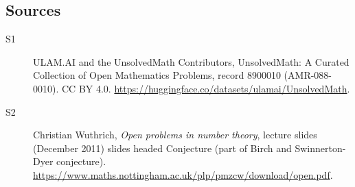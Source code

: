 \documentclass[11pt]{article}
\begin{document}
\subsection{Sources}
\begin{description}
\item[\hypertarget{source:8900010:1}{S1}] ULAM.AI and the UnsolvedMath Contributors, UnsolvedMath: A Curated Collection of Open Mathematics Problems, record 8900010 (AMR-088-0010). CC BY 4.0. \url{https://huggingface.co/datasets/ulamai/UnsolvedMath}.
\item[\hypertarget{source:8900010:2}{S2}] Christian Wuthrich, \emph{Open problems in number theory}, lecture slides (December 2011) slides headed Conjecture (part of Birch and Swinnerton-Dyer conjecture). \url{https://www.maths.nottingham.ac.uk/plp/pmzcw/download/open.pdf}.
\end{description}
\label{end:8900010}
\end{document}
